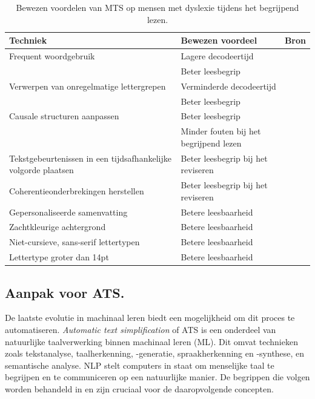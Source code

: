 \begin{center}
	\begin{table}[H]
	\begin{tabular}{ | m{5cm} | m{5cm} | m{5cm} | } 
	\hline
	\textbf{Techniek} & \textbf{Bewezen voordeel} & \textbf{Bron}\\
	\hline
	Frequent woordgebruik & Lagere decodeertijd & \autocite{Rello2013a, Gala2016} \\
	& Beter leesbegrip & \autocite{Rello2013a, Gala2016} \\
	\hline	
	Verwerpen van onregelmatige lettergrepen & Verminderde decodeertijd & \autocite{Gala2016} \\
	& Beter leesbegrip & \autocite{Gala2016} \\	
	\hline
	Causale structuren aanpassen & Beter leesbegrip & \autocite{Linderholm2000} \\
	& Minder fouten bij het begrijpend lezen & \autocite{Linderholm2000} \\
	\hline	
	Tekstgebeurtenissen in een tijdsafhankelijke volgorde plaatsen & Beter leesbegrip bij het reviseren & \autocite{Leroy2013} \\
	\hline
	Coherentieonderbrekingen herstellen & Beter leesbegrip bij het reviseren & \autocite{Leroy2013} \\
	\hline
	Gepersonaliseerde samenvatting & Betere leesbaarheid & \autocite{Nandhini2013} \\
	\hline
	Zachtkleurige achtergrond & Betere leesbaarheid & \autocite{Rello2015} \\
	\hline
	Niet-cursieve, sans-serif lettertypen & Betere leesbaarheid & \autocite{Rello2013b} \\
	\hline 
	Lettertype groter dan 14pt & Betere leesbaarheid & \autocite{Rello2013b} \\
	\hline
	\end{tabular}
	\caption{Bewezen voordelen van MTS op mensen met dyslexie tijdens het begrijpend lezen.}
	\label{table:benefits-mts}
	\end{table}
\end{center}

\subsection{Aanpak voor ATS.}

De laatste evolutie in machinaal leren biedt een mogelijkheid om dit proces te automatiseren. \textit{Automatic text simplification} of ATS is een onderdeel van natuurlijke taalverwerking binnen machinaal leren (ML). Dit omvat technieken zoals tekstanalyse, taalherkenning, -generatie, spraakherkenning en -synthese, en semantische analyse. NLP stelt computers in staat om menselijke taal te begrijpen en te communiceren op een natuurlijke manier. De begrippen die volgen worden behandeld in \textcite{Sohom2019, Eisenstein2019} en zijn cruciaal voor de daaropvolgende concepten.

